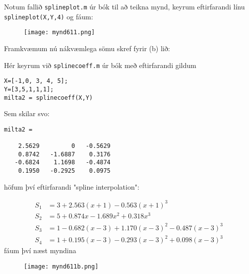 \documentclass[11pt]{article}
\begin{document}
Notum fallið \texttt{splineplot.m} úr bók til að teikna mynd, keyrum eftirfarandi línu \texttt{splineplot(X,Y,4)} og fáum:
\begin{figure}[H]
\texttt{[image: mynd611.png]}
\end{figure}
Framkvæmum nú nákvæmlega sömu skref fyrir (b) lið:

Hér keyrum við \texttt{splinecoeff.m} úr bók með eftirfarandi gildum
\begin{verbatim}
X=[-1,0, 3, 4, 5];
Y=[3,5,1,1,1];
milta2 = splinecoeff(X,Y)
\end{verbatim}
Sem skilar svo:
\begin{verbatim}
milta2 =

    2.5629         0   -0.5629
    0.8742   -1.6887    0.3176
   -0.6824    1.1698   -0.4874
    0.1950   -0.2925    0.0975
\end{verbatim}
höfum því eftirfarandi "spline interpolation":

\begin{align*}
S_1 &= 3+2.563(x+1)-0.563(x+1)^3\\
S_2 &= 5+0.874x-1.689x^2+0.318x^3\\
S_3 &= 1-0.682(x-3)+1.170(x-3)^2-0.487(x-3)^3\\
S_4 &= 1+0.195(x-3)-0.293(x-3)^2 + 0.098(x-3)^3
\end{align*}
fáum því næst myndina

\begin{figure}[H]
\texttt{[image: mynd611b.png]}
\end{figure}
\end{document}
